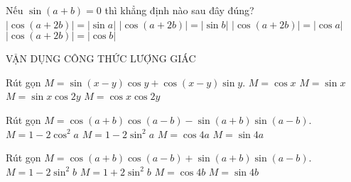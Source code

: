 \begin{ex}%
Nếu $\sin \left({a+b}\right)=0$ thì khẳng định nào sau đây đúng?
\choice
{$\left|{\cos \left({a+2b}\right)}\right|=\left|{\sin a}\right|$}
{$\left|{\cos \left({a+2b}\right)}\right|=\left|{\sin b}\right|$}
{$\left|{\cos \left({a+2b}\right)}\right|=\left|{\cos a}\right|$}
{\True $\left|{\cos \left({a+2b}\right)}\right|=\left|{\cos b}\right|$}
\end{ex}

\begin{dang}
    { VẬN DỤNG CÔNG THỨC LƯỢNG GIÁC}
\end{dang}

\begin{ex}%
Rút gọn $M=\sin \left({x-y}\right)\cos y+\cos \left({x-y}\right)\sin y.$
\choice
{$M=\cos x$}
{\True $M=\sin x$}
{$M=\sin x\cos 2y$}
{$M=\cos x\cos 2y$}
\end{ex}

\begin{ex}%
Rút gọn $M=\cos \left({a+b}\right)\cos \left({a-b}\right)-\sin \left({a+b}\right)\sin \left({a-b}\right).$
\choice
{$M=1-2\cos ^2a$}
{\True $M=1-2\sin ^2a$}
{$M=\cos 4a$}
{$M=\sin 4a$}
\end{ex}

\begin{ex}%
Rút gọn $M=\cos \left({a+b}\right)\cos \left({a-b}\right)+\sin \left({a+b}\right) \sin\left({a-b}\right).$
\choice
{\True $M=1-2\sin ^2b$}
{$M=1+2\sin ^2b$}
{$M=\cos 4b$}
{$M=\sin 4b$}
\end{ex}

